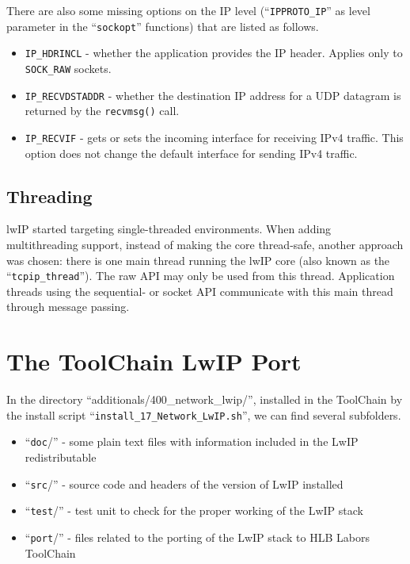 There are also some missing options on the IP level (``\verb/IPPROTO_IP/'' as level parameter in the ``\verb/sockopt/'' functions) that are listed as follows.

\begin{itemize}
  \item \verb/IP_HDRINCL/ - whether the application provides the IP header. Applies only to \verb/SOCK_RAW/ sockets.
  \item \verb/IP_RECVDSTADDR/ - whether the destination IP address for a UDP datagram is returned by the \verb/recvmsg()/ call.
  \item \verb/IP_RECVIF/ - gets or sets the incoming interface for receiving IPv4 traffic. This option does not change the default interface for sending IPv4 traffic.
\end{itemize}

\subsection{ Threading }

lwIP started targeting single-threaded environments. When adding multithreading support, instead of making the core thread-safe, another approach was chosen: there is one main thread running the lwIP core (also known as the ``\verb/tcpip_thread/''). The raw API may only be used from this thread. Application threads using the sequential- or socket API communicate with this main thread through message passing.



\section{The ToolChain LwIP Port }

In the directory ``additionals/400\_network\_lwip/'', installed in the ToolChain by the install script ``\verb/install_17_Network_LwIP.sh/'', we can find several subfolders.

\begin{itemize}
  \item ``\verb/doc//'' - some plain text files with information included in the LwIP redistributable
  \item ``\verb/src//'' - source code and headers of the version of LwIP installed
  \item ``\verb/test//'' - test unit to check for the proper working of the LwIP stack
  \item ``\verb/port//'' - files related to the porting of the LwIP stack to HLB Labors ToolChain
\end{itemize}

